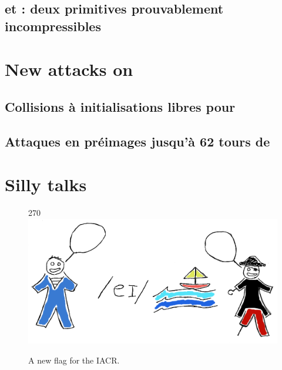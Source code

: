 \subsection{\pc et \cdb : deux primitives prouvablement incompressibles \cite{puppycipher}}

\section[Nouvelles attaques sur la fonction de hachage \shaone]{New attacks on \shaone}

\subsection{Collisions à initialisations libres pour \shaone \cite{DBLP:conf/crypto/KarpmanPS15,DBLP:conf/eurocrypt/StevensKP16}}

\subsection{Attaques en préimages jusqu'à 62 tours de \shaone \cite{DBLP:conf/crypto/EspitauFK15}}

\section[Divertissements]{Silly talks}


\begin{figure}[!htb]
\begin{center}
\begin{turn}{270}
\includegraphics[scale=0.8]{iacr_coloured.png}
\end{turn}
\end{center}
\caption{A new flag for the IACR.\label{fig:iacr_flag}}
\end{figure}


